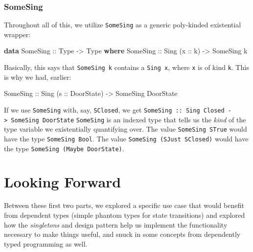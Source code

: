 \documentclass[]{article}
\newenvironment{Shaded}{}{}
\newcommand{\KeywordTok}[1]{\textcolor[rgb]{0.00,0.44,0.13}{\textbf{#1}}}
\newcommand{\DataTypeTok}[1]{\textcolor[rgb]{0.56,0.13,0.00}{#1}}
\newcommand{\OtherTok}[1]{\textcolor[rgb]{0.00,0.44,0.13}{#1}}
\newcommand{\NormalTok}[1]{#1}
\begin{document}
\subsubsection{SomeSing}\label{somesing}

Throughout all of this, we utilize \texttt{SomeSing} as a generic poly-kinded
existential wrapper:

\begin{Shaded}
\begin{Highlighting}[]
\KeywordTok{data} \DataTypeTok{SomeSing}\OtherTok{ ::} \DataTypeTok{Type} \OtherTok{->} \DataTypeTok{Type} \KeywordTok{where}
    \DataTypeTok{SomeSing}\OtherTok{ ::} \DataTypeTok{Sing}\NormalTok{ (}\OtherTok{x ::}\NormalTok{ k) }\OtherTok{->} \DataTypeTok{SomeSing}\NormalTok{ k}
\end{Highlighting}
\end{Shaded}

Basically, this says that \texttt{SomeSing\ k} contains a \texttt{Sing\ x},
where \texttt{x} is of kind \texttt{k}. This is why we had, earlier:

\begin{Shaded}
\begin{Highlighting}[]
\DataTypeTok{SomeSing}\OtherTok{ ::} \DataTypeTok{Sing}\NormalTok{ (}\OtherTok{s ::} \DataTypeTok{DoorState}\NormalTok{) }\OtherTok{->} \DataTypeTok{SomeSing} \DataTypeTok{DoorState}
\end{Highlighting}
\end{Shaded}

If we use \texttt{SomeSing} with, say, \texttt{SClosed}, we get
\texttt{SomeSing\ ::\ Sing\ \textquotesingle{}Closed\ -\textgreater{}\ SomeSing\ DoorState}
\texttt{SomeSing} is an indexed type that tells us the \emph{kind} of the type
variable we existentially quantifying over. The value \texttt{SomeSing\ STrue}
would have the type \texttt{SomeSing\ Bool}. The value
\texttt{SomeSing\ (SJust\ SClosed)} would have the type
\texttt{SomeSing\ (Maybe\ DoorState)}.

\section{Looking Forward}\label{looking-forward}

Between these first two parts, we explored a specific use case that would
benefit from dependent types (simple phantom types for state transitions) and
explored how the \emph{singletons} and design pattern help us implement the
functionality necessary to make things useful, and snuck in some concepts from
dependently typed programming as well.
\end{document}
